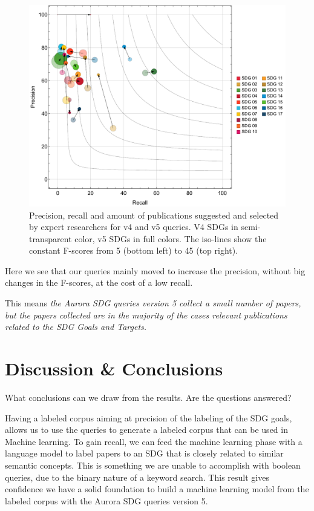 \documentclass{article}
\begin{document}
\begin{figure}[H]
	\centering
  \includegraphics[width=\textwidth]{figures/bubblechart2.pdf}
	\caption{Precision, recall and amount of publications suggested and selected by expert researchers for v4 and v5 queries. V4 SDGs in semi-transparent color, v5 SDGs in full colors. The iso-lines show the constant F-scores from 5 (bottom left) to 45 (top right). }
	\label{bubblechart}
\end{figure}

Here we see that our queries mainly moved to increase the precision, without big changes in the F-scores, at the cost of a low recall. 

This means \emph{the Aurora SDG queries version 5 collect a small number of papers, but the papers collected are in the majority of the cases relevant publications related to the SDG Goals and Targets.}

\section{Discussion \& Conclusions}
What conclusions can we draw from the results. Are the questions answered?

Having a labeled corpus aiming at precision of the labeling of the SDG goals, allows us to use the queries to generate a labeled corpus that can be used in Machine learning. \cite{zhang_matching_2020}  To gain recall, we can feed the machine learning phase with a language model to label papers to an SDG that is closely related to similar semantic concepts. This is something we are unable to accomplish with boolean queries, due to the binary nature of a keyword search. This result gives confidence we have a solid foundation to build a machine learning model from the labeled corpus with the Aurora SDG queries version 5. 
\end{document}

